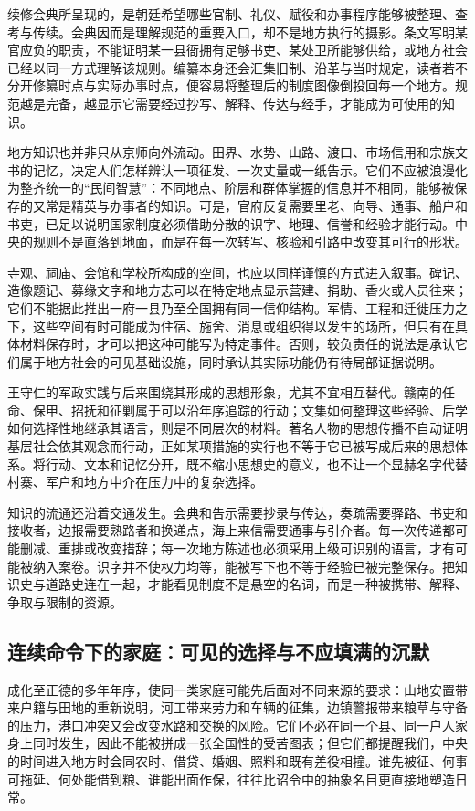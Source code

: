 续修会典所呈现的，是朝廷希望哪些官制、礼仪、赋役和办事程序能够被整理、查考与传续。会典因而是理解规范的重要入口，却不是地方执行的摄影。条文写明某官应负的职责，不能证明某一县衙拥有足够书吏、某处卫所能够供给，或地方社会已经以同一方式理解该规则。编纂本身还会汇集旧制、沿革与当时规定，读者若不分开修纂时点与实际办事时点，便容易将整理后的制度图像倒投回每一个地方。规范越是完备，越显示它需要经过抄写、解释、传达与经手，才能成为可使用的知识。

地方知识也并非只从京师向外流动。田界、水势、山路、渡口、市场信用和宗族文书的记忆，决定人们怎样辨认一项征发、一次丈量或一纸告示。它们不应被浪漫化为整齐统一的“民间智慧”：不同地点、阶层和群体掌握的信息并不相同，能够被保存的又常是精英与办事者的知识。可是，官府反复需要里老、向导、通事、船户和书吏，已足以说明国家制度必须借助分散的识字、地理、信誉和经验才能行动。中央的规则不是直落到地面，而是在每一次转写、核验和引路中改变其可行的形状。

寺观、祠庙、会馆和学校所构成的空间，也应以同样谨慎的方式进入叙事。碑记、造像题记、募缘文字和地方志可以在特定地点显示营建、捐助、香火或人员往来；它们不能据此推出一府一县乃至全国拥有同一信仰结构。军情、工程和迁徙压力之下，这些空间有时可能成为住宿、施舍、消息或组织得以发生的场所，但只有在具体材料保存时，才可以把这种可能写为特定事件。否则，较负责任的说法是承认它们属于地方社会的可见基础设施，同时承认其实际功能仍有待局部证据说明。

王守仁的军政实践与后来围绕其形成的思想形象，尤其不宜相互替代。赣南的任命、保甲、招抚和征剿属于可以沿年序追踪的行动；文集如何整理这些经验、后学如何选择性地继承其语言，则是不同层次的材料。著名人物的思想传播不自动证明基层社会依其观念而行动，正如某项措施的实行也不等于它已被写成后来的思想体系。将行动、文本和记忆分开，既不缩小思想史的意义，也不让一个显赫名字代替村寨、军户和地方中介在压力中的复杂选择。

知识的流通还沿着交通发生。会典和告示需要抄录与传达，奏疏需要驿路、书吏和接收者，边报需要熟路者和换递点，海上来信需要通事与引介者。每一次传递都可能删减、重排或改变措辞；每一次地方陈述也必须采用上级可识别的语言，才有可能被纳入案卷。识字并不使权力均等，能被写下也不等于经验已被完整保存。把知识史与道路史连在一起，才能看见制度不是悬空的名词，而是一种被携带、解释、争取与限制的资源。

\subsection{连续命令下的家庭：可见的选择与不应填满的沉默}

成化至正德的多年年序，使同一类家庭可能先后面对不同来源的要求：山地安置带来户籍与田地的重新说明，河工带来劳力和车辆的征集，边镇警报带来粮草与守备的压力，港口冲突又会改变水路和交换的风险。它们不必在同一个县、同一户人家身上同时发生，因此不能被拼成一张全国性的受苦图表；但它们都提醒我们，中央的时间进入地方时会同农时、借贷、婚姻、照料和既有差役相撞。谁先被征、何事可拖延、何处能借到粮、谁能出面作保，往往比诏令中的抽象名目更直接地塑造日常。

